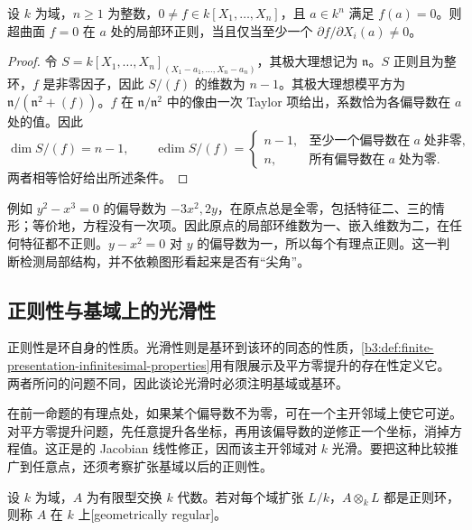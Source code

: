 \begin{proposition}\label{b3:prop:regular-hypersurface-rational-point}
	设 \(k\) 为域，\(n\ge1\) 为整数，\(0\ne f\in k[X_1,\ldots,X_n]\)，且 \(a\in k^n\) 满足 \(f(a)=0\)。则超曲面 \(f=0\) 在 \(a\) 处的局部环正则，当且仅当至少一个 \(\partial f/\partial X_i(a)\ne0\)。
\end{proposition}
\begin{proof}
	令 \(S=k[X_1,\ldots,X_n]_{(X_1-a_1,\ldots,X_n-a_n)}\)，其极大理想记为 \(\mathfrak n\)。\(S\) 正则且为整环，\(f\) 是非零因子，因此 \(S/(f)\) 的维数为 \(n-1\)。其极大理想模平方为 \(\mathfrak n/(\mathfrak n^2+(f))\)。\(f\) 在 \(\mathfrak n/\mathfrak n^2\) 中的像由一次 Taylor 项给出，系数恰为各偏导数在 \(a\) 处的值。因此
	\[
		\dim S/(f)=n-1,\qquad \operatorname{edim}S/(f)=
		\begin{cases}
			n-1,&\text{至少一个偏导数在}\;a\;\text{处非零},\\
			n,&\text{所有偏导数在}\;a\;\text{处为零}.
		\end{cases}
	\]
	两者相等恰好给出所述条件。
\end{proof}

例如 \(y^2-x^3=0\) 的偏导数为 \(-3x^2,2y\)，在原点总是全零，包括特征二、三的情形；等价地，方程没有一次项。因此原点的局部环维数为一、嵌入维数为二，在任何特征都不正则。\(y-x^2=0\) 对 \(y\) 的偏导数为一，所以每个有理点正则。这一判断检测局部结构，并不依赖图形看起来是否有“尖角”。

\subsection{正则性与基域上的光滑性}
\label{b3:subsec:1805:02}

正则性是环自身的性质。光滑性则是基环到该环的同态的性质，\cref{b3:def:finite-presentation-infinitesimal-properties}用有限展示及平方零提升的存在性定义它。两者所问的问题不同，因此谈论光滑时必须注明基域或基环。

\ProseParagraphBreak
在前一命题的有理点处，如果某个偏导数不为零，可在一个主开邻域上使它可逆。对平方零提升问题，先任意提升各坐标，再用该偏导数的逆修正一个坐标，消掉方程值。这正是的 Jacobian 线性修正，因而该主开邻域对 \(k\) 光滑。要把这种比较推广到任意点，还须考察扩张基域以后的正则性。

\begin{definition}\label{b3:def:geometrically-regular-algebra}
	设 \(k\) 为域，\(A\) 为有限型交换 \(k\) 代数。若对每个域扩张 \(L/k\)，\(A\otimes_kL\) 都是正则环，则称 \(A\) 在 \(k\) 上[geometrically regular]。
\end{definition}

